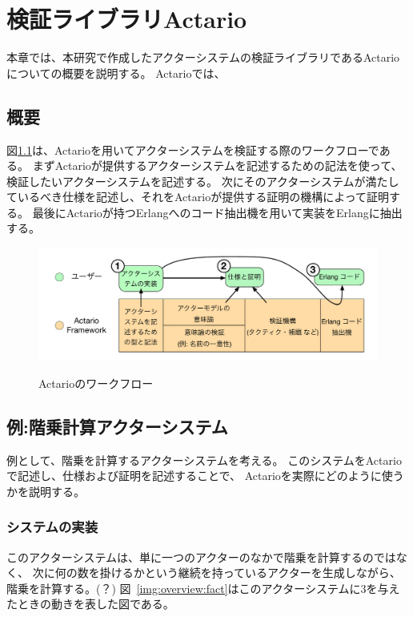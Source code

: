 \chapter{検証ライブラリActario}
\label{chapter:overview}

本章では、本研究で作成したアクターシステムの検証ライブラリであるActarioについての概要を説明する。
Actarioでは、

\section{概要}

図\ref{img:overview:workflow}は、Actarioを用いてアクターシステムを検証する際のワークフローである。
まずActarioが提供するアクターシステムを記述するための記法を使って、検証したいアクターシステムを記述する。
次にそのアクターシステムが満たしているべき仕様を記述し、それをActarioが提供する証明の機構によって証明する。
最後にActarioが持つErlangへのコード抽出機を用いて実装をErlangに抽出する。

\begin{figure}[tp]
  \centering
  \includegraphics[width=15cm]{./img/overview/workflow.pdf}
  \label{img:overview:workflow}
  \caption{Actarioのワークフロー}
\end{figure}

\section{例:階乗計算アクターシステム}

例として、階乗を計算するアクターシステムを考える。
このシステムをActarioで記述し、仕様および証明を記述することで、
Actarioを実際にどのように使うかを説明する。

\subsection{システムの実装}

このアクターシステムは、単に一つのアクターのなかで階乗を計算するのではなく、
次に何の数を掛けるかという継続を持っているアクターを生成しながら、
階乗を計算する。(？)
図~\ref{img:overview:fact}はこのアクターシステムに$3$を与えたときの動きを表した図である。

